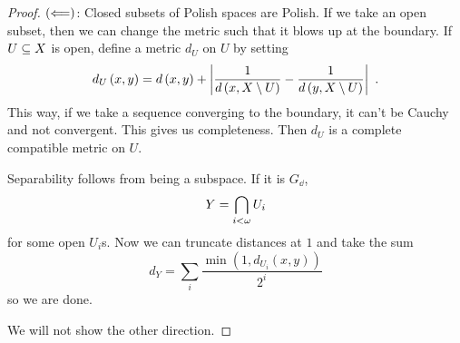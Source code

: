 \documentclass{amsart}
\begin{document}
\begin{proof}
$\left( \Longleftarrow \right)$:
Closed subsets of Polish spaces are Polish. If we take an open subset, then we can change
the metric such that it blows up at the boundary. If $U\subseteq X$ is open, define a metric
$d_U$ on $U$ by setting
\begin{equation}
d_U\left( x,y \right) = d\left( x,y \right) + \left| \frac{1}{d\left( x , X\setminus U \right)}
-\frac{1}{d\left( y , X\setminus U \right)} \right| \ .
\end{equation}
This way, if we take a sequence converging to the boundary, it can't be Cauchy and not
convergent. 
This gives us completeness. 
Then $d_U$ is a complete compatible metric on $U$. 

Separability follows from being a subspace. If it is $G_\dd$,
\begin{equation}
Y = \bigcap_{i < \omega} U_i
\end{equation}
for some open $U_i$s. Now we can truncate distances at $1$ and take the sum
\begin{equation}
d_Y = \sum_i \frac{\min\left( 1 , d_{U_i}\left( x,y \right) \right)}{2^i}
\end{equation}
so we are done.

We will not show the other direction.
\end{proof}
\end{document}
